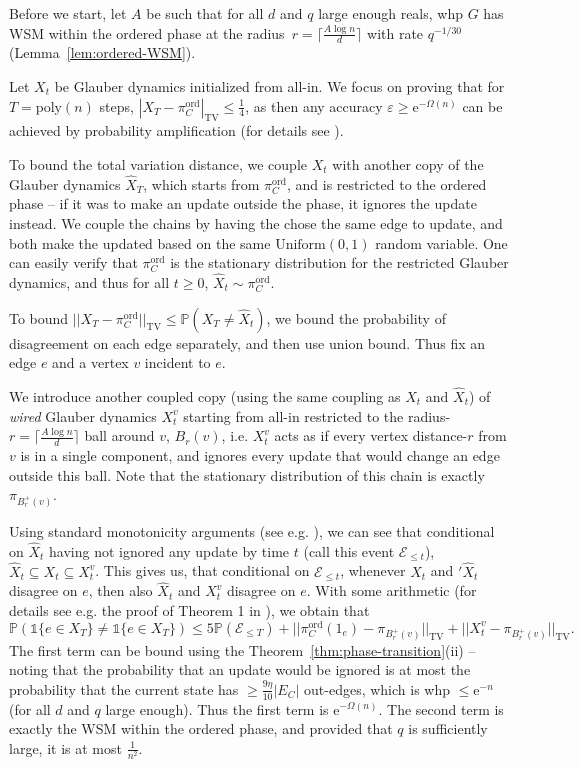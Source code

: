 \documentclass[11pt]{article}
\theoremstyle{plain}
\let\epsilon=\varepsilon
\newcommand{\emm}{\mathrm{e}}
\newcommand{\Ec}{\mathcal{E}}
\renewcommand{\P}{\mathds{P}}
\newcommand{\TV}{\mathrm{TV}}
\newcommand{\1}{\mathbb{1}}
\newcommand{\ord}{\mathrm{ord}}
\begin{document}
Before we start, let \(A\) be such that for all \(d\) and \(q\) large enough reals, whp \(G\) has WSM within the ordered phase at the radius~\(r=\lceil\frac{A\log n}{d}\rceil\) with rate \(q^{-1/30}\) (Lemma~\ref{lem:ordered-WSM}).

Let \(X_t\) be Glauber dynamics initialized from all-in. We focus on proving that for \(T = \text{poly}(n)\) steps, \(|X_T-\pi^\ord_C|_\TV\leq \tfrac 14\), as then any accuracy \(\epsilon\geq \emm^{-\Omega(n)}\) can be achieved by probability amplification (for details see \cite[Theorem~3.4]{galanis2024plantingmcmcsamplingpottsarxiv}).

To bound the total variation distance, we couple \(X_t\) with another copy of the Glauber dynamics \(\hat X_T\), which starts from \(\pi_C^\ord\), and is restricted to the ordered phase -- if it was to make an update outside the phase, it ignores the update instead. We couple the chains by having the chose the same edge to update, and both make the updated based on the same \(\text{Uniform}(0,1)\) random variable. One can easily verify that \(\pi_C^\ord\) is the stationary distribution for the restricted Glauber dynamics, and thus for all \(t\geq 0\), \(\hat X_t\sim\pi_C^\ord\).

To bound \(||X_T-\pi^\ord_C||_\TV\leq \P(X_T\neq \hat X_t)\), we bound the probability of disagreement on each edge separately, and then use union bound. Thus fix an edge \(e\) and a vertex \(v\) incident to \(e\).

We introduce another coupled copy (using the same coupling as \(X_t\) and \(\hat X_t\)) of \textit{wired} Glauber dynamics \(X_t^v\) starting from all-in restricted to the radius-\(r = \lceil\frac{A\log n}{d}\rceil\) ball around \(v\), \(B_r(v)\), i.e. \(X_t^v\) acts as if every vertex distance-\(r\) from \(v\) is in a single component, and ignores every update that would change an edge outside this ball. Note that the stationary distribution of this chain is exactly \(\pi_{B_r^+(v)}\).

Using standard monotonicity arguments (see e.g. \cite[Appendix B]{Galanis_Goldberg_Smolarova_2024}), we can see that conditional on \(\hat X_t\) having not ignored any update by time \(t\) (call this event \(\Ec_{\leq t}\)), \(\hat X_t \subseteq X_t\subseteq X_t^v\). This gives us, that conditional on \(\Ec_{\leq t}\), whenever \(X_t\) and \('\hat X_t\) disagree on \(e\), then also \(\hat X_t\) and \(X_t^v\) disagree on \(e\). With some arithmetic (for details see e.g. the proof of Theorem 1 in \cite{Galanis_Goldberg_Smolarova_2024}), we obtain that 
\[
\P(\1\{e\in X_T\}\neq \1\{e\in X_T\})\leq 5\P(\Ec_{\leq T}) + ||\pi^\ord_C(1_e) - \pi_{B_r^+(v)}||_\TV + ||X_t^v-\pi_{B_r^+(v)}||_\TV.
\]
The first term can be bound using the Theorem~\ref{thm:phase-transition}(ii) -- noting that the probability that an update would be ignored is at most the probability that the current state has \(\geq\frac{9\eta}{10}|E_C|\) out-edges, which is whp \(\leq \emm^{-n}\) (for all \(d\) and \(q\) large enough). Thus the first term is \(\emm^{-\Omega(n)}\). The second term is exactly the WSM within the ordered phase, and provided that \(q\) is sufficiently large, it is at most \(\tfrac{1}{n^2}\). 
\end{document}
